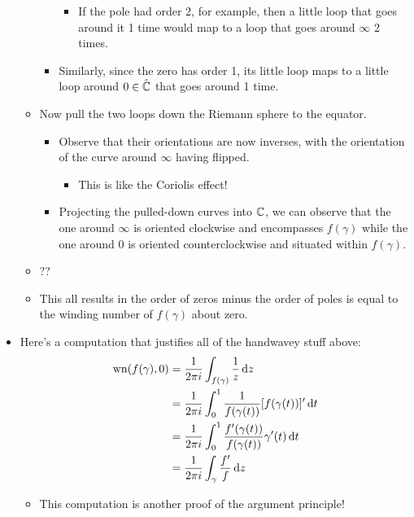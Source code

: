 \documentclass[../notes.tex]{subfiles}
\begin{document}
\begin{itemize}
\begin{itemize}
\begin{itemize}
            \begin{itemize}
                \item If the pole had order 2, for example, then a little loop that goes around it 1 time would map to a loop that goes around $\infty$ 2 times.
            \end{itemize}
            \item Similarly, since the zero has order 1, its little loop maps to a little loop around $0\in\hat{\mathbb{C}}$ that goes around 1 time.
        \end{itemize}
        \item Now pull the two loops down the Riemann sphere to the equator.
        \begin{itemize}
            \item Observe that their orientations are now inverses, with the orientation of the curve around $\infty$ having flipped.
            \begin{itemize}
                \item This is like the Coriolis effect!
            \end{itemize}
            \item Projecting the pulled-down curves into $\mathbb{C}$, we can observe that the one around $\infty$ is oriented clockwise and encompasses $f(\gamma)$ while the one around 0 is oriented counterclockwise and situated within $f(\gamma)$.
        \end{itemize}
        \item ??
        \item This all results in the order of zeros minus the order of poles is equal to the winding number of $f(\gamma)$ about zero.
    \end{itemize}
    \item Here's a computation that justifies all of the handwavey stuff above:
    \begin{align*}
        \operatorname{wn}(f(\gamma),0) &= \frac{1}{2\pi i}\int_{f(\gamma)}\frac{1}{z}\dd{z}\\
        &= \frac{1}{2\pi i}\int_0^1\frac{1}{f(\gamma(t))}[f(\gamma(t))]'\dd{t}\\
        &= \frac{1}{2\pi i}\int_0^1\frac{f'(\gamma(t))}{f(\gamma(t))}\gamma'(t)\dd{t}\\
        &= \frac{1}{2\pi i}\int_\gamma\frac{f'}{f}\dd{z}
    \end{align*}
    \begin{itemize}
        \item This computation is another proof of the argument principle!

\end{itemize}
\end{itemize}
\end{document}
